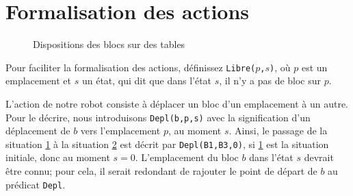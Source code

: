 \section{Formalisation des actions}\label{sec:form_act}

\begin{figure}[h]
\begin{subfigure}[b]{0.5\textwidth}
\centering
{}
\caption{}\label{fig:ex3}
\end{subfigure}%
%
\begin{subfigure}[b]{0.5\textwidth}
\centering
{}
\caption{}\label{fig:ex4}
\end{subfigure}%
%
\caption{Dispositions des blocs sur des tables}\label{fig:blocs_tables1}
\end{figure}


\begin{exo}\label{ex:libre}
Pour faciliter la formalisation des actions, définissez 
  \texttt{Libre($p$,$s$)}, où $p$ est un emplacement et $s$ un état, qui dit que
  dans l'état $s$, il n'y a pas de bloc sur $p$. 
\end{exo}

L'action de notre robot consiste à déplacer un bloc d'un emplacement à un
autre. Pour le décrire, nous introduisons \texttt{Depl(b,p,s)} avec la signification d'un déplacement de $b$ vers l'emplacement $p$, au
moment $s$. Ainsi, le passage de la situation \ref{fig:ex3} à la situation
\ref{fig:ex4} est décrit par \texttt{Depl(B1,B3,0)}, si \ref{fig:ex3} est
la situation initiale, donc au moment $s = 0$.
L'emplacement du bloc $b$ dans l'état $s$ devrait être connu; pour
cela, il serait redondant de rajouter le point de départ de $b$ au prédicat
\texttt{Depl}.

